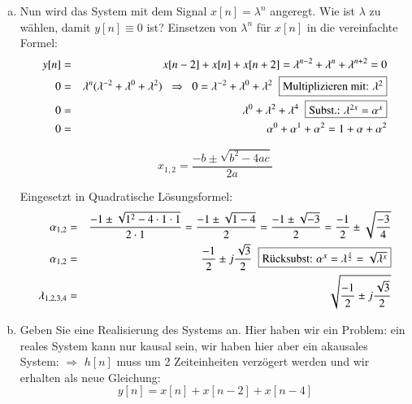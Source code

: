 \begin{uebsp}
\begin{Answer}
\begin{enumerate}[a)]
     \item Nun wird das System mit dem Signal $x[n] = \lambda^n$ angeregt.
        Wie ist $\lambda$ zu wählen, damit $y[n] \equiv 0$ ist?
             Einsetzen von $\lambda^n$ für $x[n]$ in die vereinfachte Formel:
            \begin{eqnarray*}
                y[n]&=&x[n-2]+x[n]+x[n+2]=\lambda^{n-2}+\lambda^n+\lambda^{n+2}=0\\
                0&=&\lambda^n(\lambda^{-2}+\lambda^0+\lambda^{2})\;\;\Rightarrow\;\;0=\lambda^{-2}+\lambda^0+\lambda^{2}\;\;\fbox{Multiplizieren mit: $\lambda^2$}\\
                0&=&\lambda^{0}+\lambda^2+\lambda^{4}\;\;\fbox{Subst.: $\lambda^{2x}=\alpha^{x}$}\\
                0&=&\alpha^{0}+\alpha^1+\alpha^{2}=1+\alpha+\alpha^2
            \end{eqnarray*}
            \begin{definition}
                \[x_{1,2}=\frac{-b\pm\sqrt{b^2-4ac}}{2a}\]
            \end{definition}
            Eingesetzt in Quadratische Lösungsformel:
            \begin{eqnarray*}
                \alpha_{1,2}&=&\frac{-1\pm\sqrt{1^2-4\cdot1\cdot1}}{2\cdot1}=\frac{-1\pm\sqrt{1-4}}{2}=\frac{-1\pm\sqrt{-3}}{2}=\frac{-1}{2}\pm\sqrt{\frac{-3}{4}}\\
                \alpha_{1,2}&=&\frac{-1}{2}\pm j\frac{\sqrt3}{2}\;\;\fbox{Rücksubst: $\alpha^{x}=\lambda^{\frac{x}{2}}=\sqrt{\lambda^x}$}\\
                \lambda_{1,2,3,4}&=&\sqrt{\frac{-1}{2}\pm j\frac{\sqrt3}{2}}\\
            \end{eqnarray*}
        \item Geben Sie eine Realisierung des Systems an.
            Hier haben wir ein Problem: ein reales System kann nur kausal sein, wir haben hier aber ein akausales System: $\Rightarrow$ $h[n]$ muss um 2 Zeiteinheiten verzögert werden und wir erhalten als neue Gleichung:
            \[y[n]=x[n]+x[n-2]+x[n-4]\]
         \begin{center}
\end{center}
\end{enumerate}
\end{Answer}
\end{uebsp}
